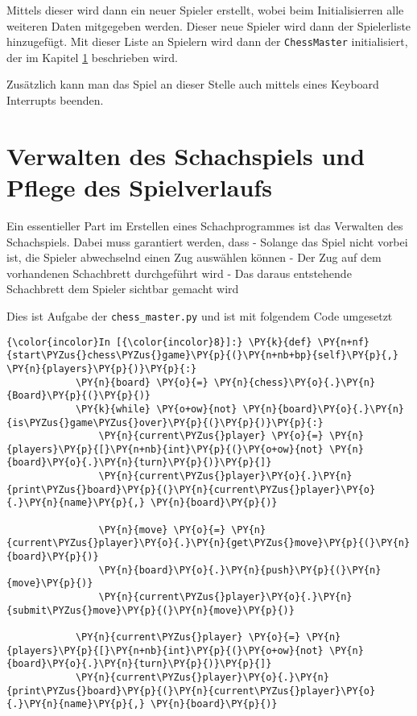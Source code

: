     Mittels dieser wird dann ein neuer Spieler erstellt, wobei beim
Initialisierren alle weiteren Daten mitgegeben werden. Dieser neue
Spieler wird dann der Spielerliste hinzugefügt. Mit dieser Liste an
Spielern wird dann der \texttt{ChessMaster} initialisiert, der im
Kapitel \ref{verwalten-des-schachspiels-und-pflege-des-spielverlaufs} beschrieben wird.

Zusätzlich kann man das Spiel an dieser Stelle auch mittels eines
Keyboard Interrupts beenden.

    \section{Verwalten des Schachspiels und Pflege des
Spielverlaufs}\label{verwalten-des-schachspiels-und-pflege-des-spielverlaufs}

Ein essentieller Part im Erstellen eines Schachprogrammes ist das
Verwalten des Schachspiels. Dabei muss garantiert werden, dass - Solange
das Spiel nicht vorbei ist, die Spieler abwechselnd einen Zug auswählen
können - Der Zug auf dem vorhandenen Schachbrett durchgeführt wird - Das
daraus entstehende Schachbrett dem Spieler sichtbar gemacht wird

Dies ist Aufgabe der \texttt{chess\_master.py} und ist mit folgendem
Code umgesetzt

    \begin{Verbatim}[commandchars=\\\{\}]
{\color{incolor}In [{\color{incolor}8}]:} \PY{k}{def} \PY{n+nf}{start\PYZus{}chess\PYZus{}game}\PY{p}{(}\PY{n+nb+bp}{self}\PY{p}{,} \PY{n}{players}\PY{p}{)}\PY{p}{:}
            \PY{n}{board} \PY{o}{=} \PY{n}{chess}\PY{o}{.}\PY{n}{Board}\PY{p}{(}\PY{p}{)}
            \PY{k}{while} \PY{o+ow}{not} \PY{n}{board}\PY{o}{.}\PY{n}{is\PYZus{}game\PYZus{}over}\PY{p}{(}\PY{p}{)}\PY{p}{:}
                \PY{n}{current\PYZus{}player} \PY{o}{=} \PY{n}{players}\PY{p}{[}\PY{n+nb}{int}\PY{p}{(}\PY{o+ow}{not} \PY{n}{board}\PY{o}{.}\PY{n}{turn}\PY{p}{)}\PY{p}{]}
                \PY{n}{current\PYZus{}player}\PY{o}{.}\PY{n}{print\PYZus{}board}\PY{p}{(}\PY{n}{current\PYZus{}player}\PY{o}{.}\PY{n}{name}\PY{p}{,} \PY{n}{board}\PY{p}{)}
        
                \PY{n}{move} \PY{o}{=} \PY{n}{current\PYZus{}player}\PY{o}{.}\PY{n}{get\PYZus{}move}\PY{p}{(}\PY{n}{board}\PY{p}{)}
                \PY{n}{board}\PY{o}{.}\PY{n}{push}\PY{p}{(}\PY{n}{move}\PY{p}{)}
                \PY{n}{current\PYZus{}player}\PY{o}{.}\PY{n}{submit\PYZus{}move}\PY{p}{(}\PY{n}{move}\PY{p}{)}
        
            \PY{n}{current\PYZus{}player} \PY{o}{=} \PY{n}{players}\PY{p}{[}\PY{n+nb}{int}\PY{p}{(}\PY{o+ow}{not} \PY{n}{board}\PY{o}{.}\PY{n}{turn}\PY{p}{)}\PY{p}{]}
            \PY{n}{current\PYZus{}player}\PY{o}{.}\PY{n}{print\PYZus{}board}\PY{p}{(}\PY{n}{current\PYZus{}player}\PY{o}{.}\PY{n}{name}\PY{p}{,} \PY{n}{board}\PY{p}{)}
\end{Verbatim}

